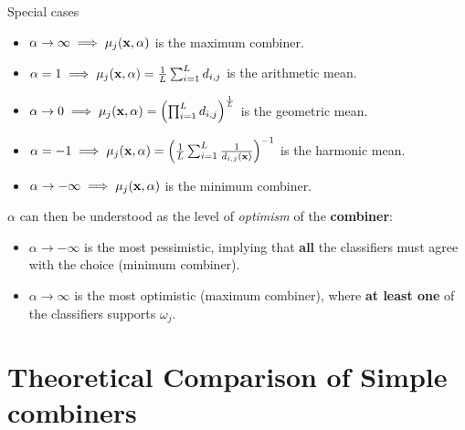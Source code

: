 \documentclass[xcolor=table]{beamer}
\begin{document}
\begin{frame}{Special cases}
\begin{itemize}
\item \(\alpha \to \infty \implies \mu_j({\mathbf x},\alpha)\) is the maximum combiner.\\
    \pause
    \pause
    
    \item \(\alpha = 1 \implies \mu_j({\mathbf x},\alpha) = \frac{1}{L} \sum_{i=1}^L d_{i,j}\) is the arithmetic mean.
    \item \(\alpha \to 0 \implies \mu_j({\mathbf x},\alpha) = \left(\prod_{i=1}^L d_{i,j}\right)^{\frac{1}{L}}\) is the geometric mean.
    \item \(\alpha = -1 \implies \mu_j({\mathbf x},\alpha) = \left( \frac{1}{L} \sum_{i=1}^L \frac{1}{d_{i,j}({\mathbf x})} \right)^{-1} \) is the harmonic mean.
    
    
    \item \(\alpha \to -\infty \implies \mu_j({\mathbf x},\alpha)\) is the minimum combiner.\\
\end{itemize}

\pause

\(\alpha\) can then be understood as the level of \emph{optimism} of the \textbf{combiner}:
\begin{itemize}
    \item \(\alpha \to -\infty\) is the most pessimistic, implying that \textbf{all} the classifiers must agree with the choice (minimum combiner).
    \item \(\alpha \to \infty\) is the most optimistic (maximum combiner), where \textbf{at least one} of the classifiers supports \(\omega_j\).
\end{itemize} 
    
\end{frame}

\section{Theoretical Comparison of Simple combiners}
\end{document}
